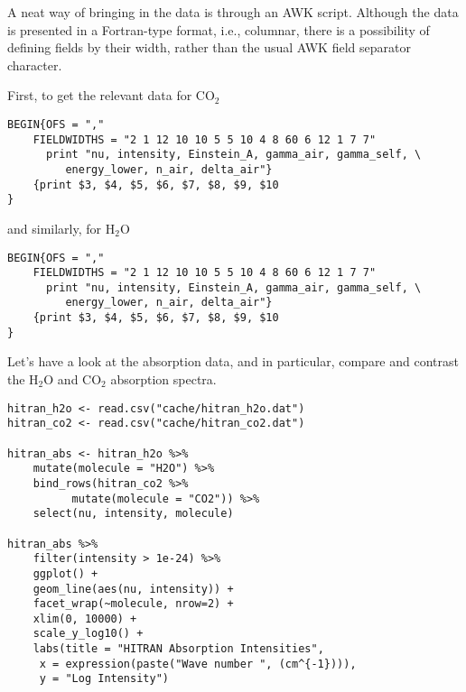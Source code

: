 \documentclass[10pt,a4paper,titlepage]{article}
\begin{document}
A neat way of bringing in the data is through an AWK script. Although
the data is presented in a Fortran-type format, i.e., columnar, there
is a possibility of defining fields by their width, rather than the
usual AWK field separator character.

First, to get the relevant data for CO$_{\text{2}}$
\begin{lstlisting}
BEGIN{OFS = ","
    FIELDWIDTHS = "2 1 12 10 10 5 5 10 4 8 60 6 12 1 7 7"
      print "nu, intensity, Einstein_A, gamma_air, gamma_self, \
	     energy_lower, n_air, delta_air"}
    {print $3, $4, $5, $6, $7, $8, $9, $10
}
\end{lstlisting}

and similarly, for H$_{\text{2}}$O
\begin{lstlisting}
BEGIN{OFS = ","
    FIELDWIDTHS = "2 1 12 10 10 5 5 10 4 8 60 6 12 1 7 7"
      print "nu, intensity, Einstein_A, gamma_air, gamma_self, \
	     energy_lower, n_air, delta_air"}
    {print $3, $4, $5, $6, $7, $8, $9, $10
}
\end{lstlisting}

Let's have a look at the absorption data, and in particular, compare
and contrast the H$_{\text{2}}$O and CO$_{\text{2}}$ absorption spectra.

\begin{lstlisting}
hitran_h2o <- read.csv("cache/hitran_h2o.dat")
hitran_co2 <- read.csv("cache/hitran_co2.dat")

hitran_abs <- hitran_h2o %>%
    mutate(molecule = "H2O") %>%
    bind_rows(hitran_co2 %>%
	      mutate(molecule = "CO2")) %>%
    select(nu, intensity, molecule)

hitran_abs %>%
    filter(intensity > 1e-24) %>%
    ggplot() +
    geom_line(aes(nu, intensity)) +
    facet_wrap(~molecule, nrow=2) +
    xlim(0, 10000) +
    scale_y_log10() +
    labs(title = "HITRAN Absorption Intensities",
	 x = expression(paste("Wave number ", (cm^{-1}))),
	 y = "Log Intensity")
\end{lstlisting}
\end{document}
